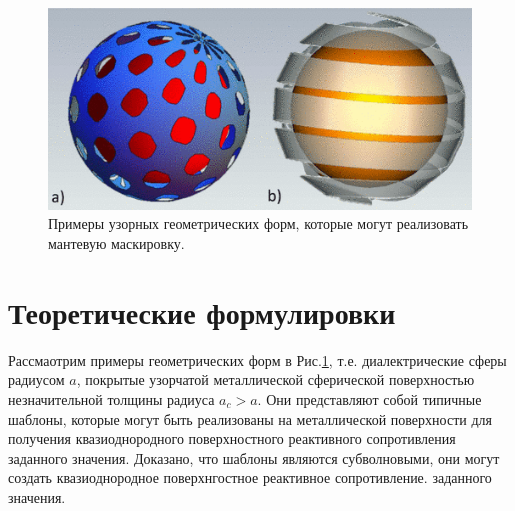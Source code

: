 \documentclass[12pt,a4paper]{article}
\begin{document}
\begin{figure}[t]
  \centering
  \includegraphics[height=0.15\paperheight]{1.png}
  \caption{Примеры узорных геометрических форм, которые могут реализовать мантевую маскировку.}
  \label{fig:1}
\end{figure}

\section{Теоретические формулировки}
Рассмаотрим примеры геометрических форм в Рис.\ref{fig:1}, т.е. диалектрические сферы радиусом $a$,
покрытые узорчатой металлической сферической поверхностью незначительной толщины радиуса $a_c > a$.
Они представляют собой типичные шаблоны, которые могут быть реализованы на металлической поверхности
для получения квазиоднородного поверхностного реактивного сопротивления заданного значения. Доказано, что
шаблоны являются субволновыми, они могут создать квазиоднородное поверхнгостное реактивное сопротивление.
заданного значения.
\end{document}
